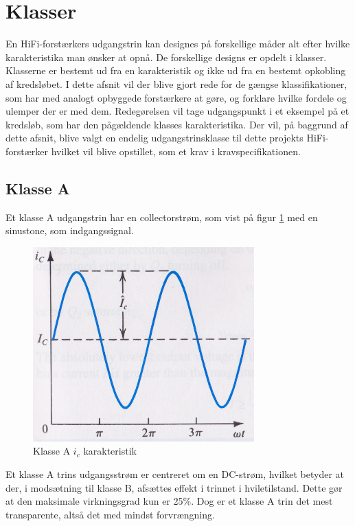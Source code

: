 \section{Klasser}
\label{klasser}
En HiFi-forstærkers udgangstrin kan designes på forskellige måder alt efter hvilke karakteristika man ønsker at opnå. De forskellige designs er opdelt i klasser. Klasserne er bestemt ud fra en karakteristik og ikke ud fra en bestemt opkobling af kredsløbet. 
I dette afsnit vil der blive gjort rede for de gængse klassifikationer, som har med analogt opbyggede forstærkere at gøre, og forklare hvilke fordele og ulemper der er med dem. Redegørelsen vil tage udgangspunkt i et eksempel på et kredsløb, som har den pågældende klasses karakteristika. 
Der vil, på baggrund af dette afsnit, blive valgt en endelig udgangstrinsklasse til dette projekts HiFi-forstærker hvilket vil blive opstillet, som et krav i kravspecifikationen.

\subsection{Klasse A}

Et klasse A udgangstrin har en collectorstrøm, som vist på figur \ref{fig:klassea} med en sinustone, som indgangssignal. 

\begin{figure}[h]
\centering
\includegraphics[scale=.35]{indledende_analyse/klasser/klassea.png}
\caption{Klasse A $i_c$ karakteristik}
\label{fig:klassea}
\end{figure}

Et klasse A trins udgangsstrøm er centreret om en DC-strøm, hvilket betyder at der, i modsætning til klasse B, afsættes effekt i trinnet i hviletilstand. Dette gør at den maksimale virkningsgrad kun er 25\%. Dog er et klasse A trin det mest transparente, altså det med mindst forvrængning.

